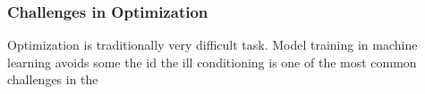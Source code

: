 \subsubsection{Challenges in Optimization}

Optimization is traditionally very difficult task. Model training in machine learning avoids some the id
the ill conditioning is one of the most common challenges in the 